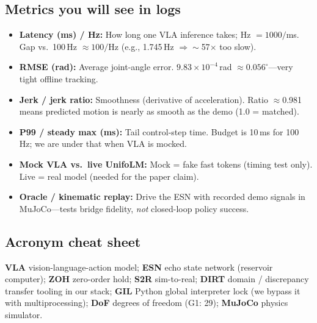 \documentclass[conference]{IEEEtran}
\begin{document}
\subsection{Metrics you will see in logs}
\begin{itemize}
    \item \textbf{Latency (ms) / Hz:} How long one VLA inference takes; Hz $= 1000/$ms. Gap vs.\ 100\,Hz $\approx 100/$Hz (e.g., 1.745\,Hz $\Rightarrow \sim$57$\times$ too slow).
    \item \textbf{RMSE (rad):} Average joint-angle error. $9.83\times10^{-4}$\,rad $\approx 0.056^\circ$---very tight offline tracking.
    \item \textbf{Jerk / jerk ratio:} Smoothness (derivative of acceleration). Ratio $\approx$0.981 means predicted motion is nearly as smooth as the demo (1.0 = matched).
    \item \textbf{P99 / steady max (ms):} Tail control-step time. Budget is 10\,ms for 100\,Hz; we are under that when VLA is mocked.
    \item \textbf{Mock VLA vs.\ live UnifoLM:} Mock = fake fast tokens (timing test only). Live = real model (needed for the paper claim).
    \item \textbf{Oracle / kinematic replay:} Drive the ESN with recorded demo signals in MuJoCo---tests bridge fidelity, \emph{not} closed-loop policy success.
\end{itemize}

\subsection{Acronym cheat sheet}
\textbf{VLA} vision-language-action model; \textbf{ESN} echo state network (reservoir computer); \textbf{ZOH} zero-order hold; \textbf{S2R} sim-to-real; \textbf{DIRT} domain / discrepancy transfer tooling in our stack; \textbf{GIL} Python global interpreter lock (we bypass it with multiprocessing); \textbf{DoF} degrees of freedom (G1: 29); \textbf{MuJoCo} physics simulator.
\end{document}
